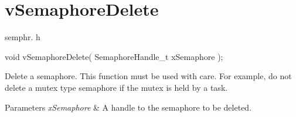\hypertarget{group__vSemaphoreDelete}{}\section{v\+Semaphore\+Delete}
\label{group__vSemaphoreDelete}
semphr. h 
\begin{DoxyPre}void vSemaphoreDelete( SemaphoreHandle\_t xSemaphore );\end{DoxyPre}


Delete a semaphore. This function must be used with care. For example, do not delete a mutex type semaphore if the mutex is held by a task.


\begin{DoxyParams}{Parameters}
{\em x\+Semaphore} & A handle to the semaphore to be deleted. \\
\hline
\end{DoxyParams}
